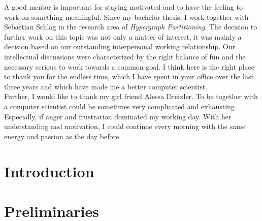 \documentclass[12pt,a4paper,twoside, enabledeprecatedfontcommands]{scrartcl}
\numberwithin{equation}{section}
\begin{document}
A good mentor is important for staying motivated and to have the feeling to work
on something meaningful. Since my bachelor thesis, I work together with Sebastian
Schlag in the research area of \emph{Hypergraph Partitioning}. The decision to further
work on this topic was not only a matter of interest, it was mainly a decision based
on our outstanding interpersonal working relationship. Our intellectual discussions
were characterized by the right balance of fun and the necessary serious to work towards
a common goal. I think here is the right place to thank you for the endless time, which I have spent
in your office over the last three years and which have made me a better computer scientist. \\
Further, I would like to thank my girl friend Alessa Dreixler. To be together with a 
computer scientist could be sometimes very complicated and exhausting. Especially,
if anger and frustration dominated my working day. With her understanding and motivation, 
I could continue every morning with the same energy and passion as the day before.


\vfill\vfill\vfill
\clearpage


\pagestyle{normal}
\renewcommand\sectionmark[1]{\markboth{\thesection\quad\MakeUppercase{#1}}{\thesection\quad\MakeUppercase{#1}}}
\renewcommand\subsectionmark[1]{\markright{\thesubsection\quad\MakeUppercase{#1}}}

\tableofcontents

\clearpage


%


\section{Introduction}



\newpage


\section{Preliminaries}
\label{sec:preliminaries}
\end{document}
